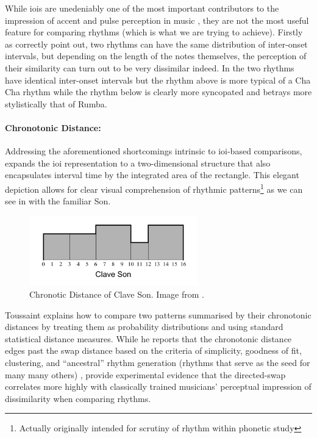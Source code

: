 While \acrshort{ioi}s are unedeniably one of the most important contributors to the impression of accent and pulse perception in music \citep{Parncutt1994} , they are not the most useful feature for comparing rhythms (which is what we are trying to achieve). Firstly as \cite{Dixon2004} correctly point out, two rhythms can have the same distribution of inter-onset intervals, but depending on the length of the notes themselves, the perception of their similarity can turn out to be very dissimilar indeed. In  the two rhythms have identical inter-onset intervals but the rhythm above is more typical of a Cha Cha rhythm while the rhythm below is clearly more syncopated and betrays more stylistically that of Rumba.


\paragraph{Chronotonic Distance:} 
Addressing the aforementioned shortcomings intrinsic to \acrshort{ioi}-based comparisons, \cite{gustafson1987new} expands the \acrshort{ioi} representation to a two-dimensional structure that also encapsulates interval time by the integrated area of the rectangle. This elegant depiction allows for clear visual comprehension of rhythmic patterns\footnote{Actually originally intended for scrutiny of rhythm within phonetic study} as we can see in  with the familiar Son. 

\begin{figure}
	\begin{center}
		\includegraphics[width=0.65\textwidth]{ch03_symbolic/figures/chronotonic.png}
	\end{center}
	\caption[Chronotic Distance of Clave Son]{Chronotic Distance of Clave Son. Image from \cite{Toussaint2004}.}
	\label{fig:chronotnic}
\end{figure}

Toussaint explains how to compare two patterns summarised by their chronotonic distances by treating them as probability distributions and using standard statistical distance measures. While he reports that the chronotonic distance edges past the swap distance based on the criteria of simplicity, goodness of fit, clustering, and ``ancestral'' rhythm generation (rhythms that serve as the seed for many many others) \citeyearpar{Toussaint2004}, \cite{Guastavino2008} provide experimental evidence that the directed-swap correlates more highly with classically trained musicians’ perceptual impression of dissimilarity when comparing rhythms.

